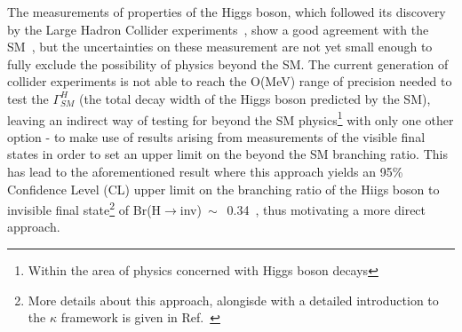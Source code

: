 \hspace{10pt} The measurements of properties of the Higgs boson, which followed its discovery by the Large Hadron Collider experiments~\cite{paper:higgs_discovery1,paper:higgs_discovery2}, show a good agreement with the SM~\cite{paper:higgs_prop1,paper:higgs_prop2,paper:higgs_prop3}, but the uncertainties on these measurement are not yet small enough to fully exclude the possibility of physics beyond the SM. The current generation of collider experiments is not able to reach the O(MeV) range of precision needed to test the $\Gamma_{SM}^H$ (the total decay width of the Higgs boson predicted by the SM), leaving an indirect way of testing for beyond the SM physics\footnote{Within the area of physics concerned with Higgs boson decays} with only one other option - to make use of results arising from measurements of the visible final states in order to set an upper limit on the beyond the SM branching ratio. This has lead to the aforementioned result where this approach yields an 95\% Confidence Level (CL) upper limit on the branching ratio of the Hiigs boson to invisible final state\footnote{More details about this approach, alongisde with a detailed introduction to the $\kappa$ framework is given in Ref.~\cite{report_lhcxswg_3}} of Br(H$\rightarrow$inv)$~\sim$~0.34~\cite{paper:higgs_prop1}, thus motivating a more direct approach.



